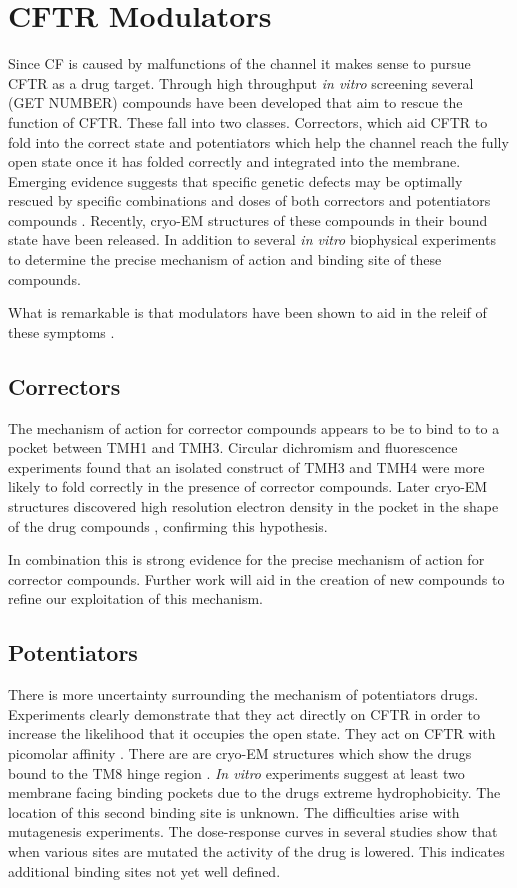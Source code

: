 \section{CFTR Modulators}
Since CF is caused by malfunctions of the channel it makes sense to pursue CFTR as a drug target. Through high throughput \textit{in vitro} screening several (GET NUMBER) compounds have been developed that aim to rescue the function of CFTR. These fall into two classes. Correctors, which aid CFTR to fold into the correct state and potentiators which help the channel reach the fully open state once it has folded correctly and integrated into the membrane. Emerging evidence suggests that specific genetic defects may be optimally rescued by specific combinations and doses of both correctors and potentiators compounds \cite{}. Recently, cryo-EM structures of these compounds in their bound state have been released. In addition to several \textit {in vitro} biophysical experiments to determine the precise mechanism of action and binding site of these compounds.

What is remarkable is that modulators have been shown to aid in the releif of these symptoms \cite{lopes-pacheco2020}.

\subsection{Correctors}
The mechanism of action for corrector compounds appears to be to bind to to a pocket between TMH1 and TMH3. Circular dichromism and fluorescence experiments found that an isolated construct of TMH3 and TMH4 were more likely to fold correctly in the presence of corrector compounds. Later cryo-EM structures discovered high resolution electron density in the pocket in the shape of the drug compounds \cite{fiedorczuk2022}, confirming this hypothesis. 

In combination this is strong evidence for the precise mechanism of action for corrector compounds. Further work will aid in the creation of new compounds to refine our exploitation of this mechanism.

\subsection{Potentiators}
There is more uncertainty surrounding the mechanism of potentiators drugs. Experiments clearly demonstrate that they act directly on CFTR in order to increase the likelihood that it occupies the open state. They act on CFTR with picomolar affinity \cite{csanady2019}. There are are cryo-EM structures which show the drugs bound to the TM8 hinge region \cite{}. \textit {In vitro} experiments suggest at least two membrane facing binding pockets due to the drugs extreme hydrophobicity\cite{csanady2019}. The location of this second binding site is unknown. The difficulties arise with mutagenesis experiments. The dose-response curves in several studies show that when various sites are mutated the activity of the drug is lowered. This indicates additional binding sites not yet well defined. 

